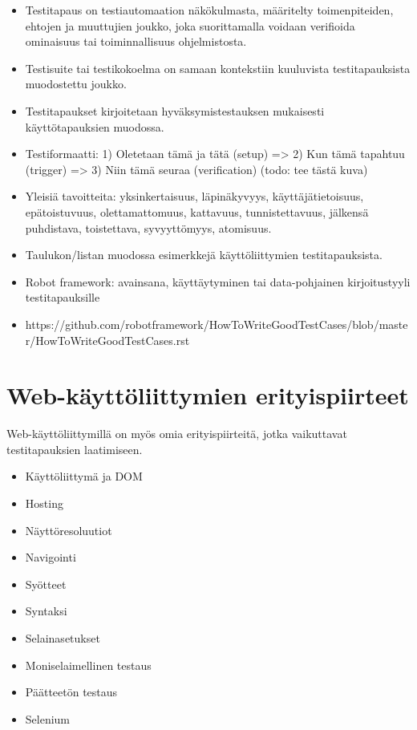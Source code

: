   \begin{itemize}
    \item Testitapaus on testiautomaation näkökulmasta, määritelty toimenpiteiden, ehtojen ja muuttujien joukko, joka suorittamalla voidaan verifioida ominaisuus tai toiminnallisuus ohjelmistosta.
    \item Testisuite tai testikokoelma on samaan kontekstiin kuuluvista testitapauksista muodostettu joukko.
    \item Testitapaukset kirjoitetaan hyväksymistestauksen mukaisesti käyttötapauksien muodossa.
    \item Testiformaatti: 1) Oletetaan tämä ja tätä (setup) => 2) Kun tämä tapahtuu (trigger) => 3) Niin tämä seuraa (verification) (todo: tee tästä kuva)
    \item Yleisiä tavoitteita: yksinkertaisuus, läpinäkyvyys, käyttäjätietoisuus, epätoistuvuus, olettamattomuus, kattavuus, tunnistettavuus, jälkensä puhdistava, toistettava, syvyyttömyys, atomisuus.
    \item Taulukon/listan muodossa esimerkkejä käyttöliittymien testitapauksista.
    \item Robot framework: avainsana, käyttäytyminen tai data-pohjainen kirjoitustyyli testitapauksille
    \item https://github.com/robotframework/HowToWriteGoodTestCases/blob/master/HowToWriteGoodTestCases.rst
  \end{itemize}

\section{Web-käyttöliittymien erityispiirteet} \label{ch:08_webkayttoliittymien_erityispiirteet}

  Web-käyttöliittymillä on myös omia erityispiirteitä, jotka vaikuttavat testitapauksien laatimiseen.

  \begin{itemize}
    \item Käyttöliittymä ja DOM
    \item Hosting
    \item Näyttöresoluutiot
    \item Navigointi
    \item Syötteet
    \item Syntaksi
    \item Selainasetukset
    \item Moniselaimellinen testaus
    \item Päätteetön testaus
    \item Selenium
  \end{itemize}

